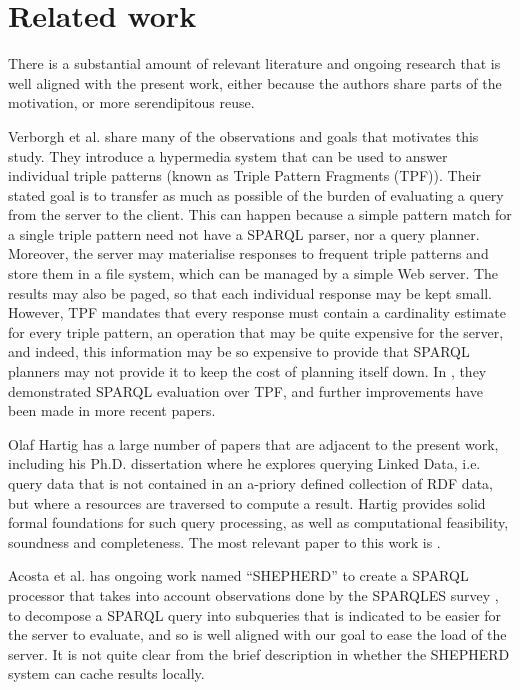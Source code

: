 \section{Related work}\label{sec:related}

There is a substantial amount of relevant literature and ongoing
research that is well aligned with the present work, either because
the authors share parts of the motivation, or more serendipitous
reuse.

Verborgh et al. \cite{ldf1} share many of the observations and goals
that motivates this study. They introduce a hypermedia system that can
be used to answer individual triple patterns (known as Triple Pattern
Fragments (TPF)). Their stated goal is to transfer as much as possible
of the burden of evaluating a query from the server to the
client. This can happen because a simple pattern match for a single
triple pattern need not have a SPARQL parser, nor a query
planner. Moreover, the server may materialise responses to frequent
triple patterns and store them in a file system, which can be managed
by a simple Web server. The results may also be paged, so that each
individual response may be kept small. However, TPF mandates that
every response must contain a cardinality estimate for every triple
pattern, an operation that may be quite expensive for the server, and
indeed, this information may be so expensive to provide that SPARQL
planners may not provide it to keep the cost of planning itself
down. In \cite{verborgh2014querying}, they demonstrated SPARQL evaluation over TPF,
and further improvements have been made in more recent papers.

Olaf Hartig has a large number of papers that are adjacent to the
present work, including his Ph.D. dissertation \cite{hartig2014querying} where he
explores querying Linked Data, i.e. query data that is not contained
in an a-priory defined collection of RDF data, but where a resources
are traversed to compute a result. Hartig provides solid formal
foundations for such query processing, as well as computational
feasibility, soundness and completeness. The most relevant paper to
this work is \cite{hartig2011caching}.

Acosta et al. \cite{acosta2014shepherd} has ongoing work named ``SHEPHERD'' to
create a SPARQL processor that takes into account observations done by
the SPARQLES survey \cite{buil2013sparql}, to decompose a SPARQL query into
subqueries that is indicated to be easier for the server to evaluate,
and so is well aligned with our goal to ease the load of the
server. It is not quite clear from the brief description in 
\cite{acosta2014shepherd} whether the SHEPHERD system can cache results locally.

